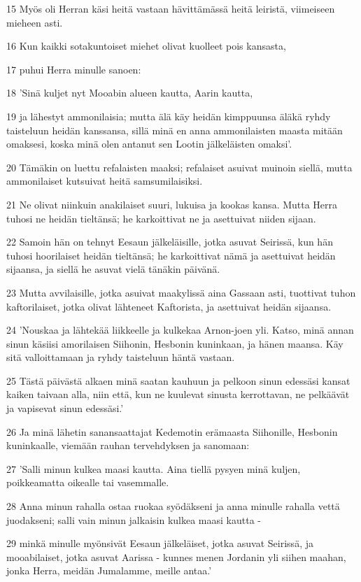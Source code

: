 \par 15 Myös oli Herran käsi heitä vastaan hävittämässä heitä leiristä, viimeiseen mieheen asti.
\par 16 Kun kaikki sotakuntoiset miehet olivat kuolleet pois kansasta,
\par 17 puhui Herra minulle sanoen:
\par 18 'Sinä kuljet nyt Mooabin alueen kautta, Aarin kautta,
\par 19 ja lähestyt ammonilaisia; mutta älä käy heidän kimppuunsa äläkä ryhdy taisteluun heidän kanssansa, sillä minä en anna ammonilaisten maasta mitään omaksesi, koska minä olen antanut sen Lootin jälkeläisten omaksi'.
\par 20 Tämäkin on luettu refalaisten maaksi; refalaiset asuivat muinoin siellä, mutta ammonilaiset kutsuivat heitä samsumilaisiksi.
\par 21 Ne olivat niinkuin anakilaiset suuri, lukuisa ja kookas kansa. Mutta Herra tuhosi ne heidän tieltänsä; he karkoittivat ne ja asettuivat niiden sijaan.
\par 22 Samoin hän on tehnyt Eesaun jälkeläisille, jotka asuvat Seirissä, kun hän tuhosi hoorilaiset heidän tieltänsä; he karkoittivat nämä ja asettuivat heidän sijaansa, ja siellä he asuvat vielä tänäkin päivänä.
\par 23 Mutta avvilaisille, jotka asuivat maakylissä aina Gassaan asti, tuottivat tuhon kaftorilaiset, jotka olivat lähteneet Kaftorista, ja asettuivat heidän sijaansa.
\par 24 'Nouskaa ja lähtekää liikkeelle ja kulkekaa Arnon-joen yli. Katso, minä annan sinun käsiisi amorilaisen Siihonin, Hesbonin kuninkaan, ja hänen maansa. Käy sitä valloittamaan ja ryhdy taisteluun häntä vastaan.
\par 25 Tästä päivästä alkaen minä saatan kauhuun ja pelkoon sinun edessäsi kansat kaiken taivaan alla, niin että, kun ne kuulevat sinusta kerrottavan, ne pelkäävät ja vapisevat sinun edessäsi.'
\par 26 Ja minä lähetin sanansaattajat Kedemotin erämaasta Siihonille, Hesbonin kuninkaalle, viemään rauhan tervehdyksen ja sanomaan:
\par 27 'Salli minun kulkea maasi kautta. Aina tiellä pysyen minä kuljen, poikkeamatta oikealle tai vasemmalle.
\par 28 Anna minun rahalla ostaa ruokaa syödäkseni ja anna minulle rahalla vettä juodakseni; salli vain minun jalkaisin kulkea maasi kautta -
\par 29 minkä minulle myönsivät Eesaun jälkeläiset, jotka asuvat Seirissä, ja mooabilaiset, jotka asuvat Aarissa - kunnes menen Jordanin yli siihen maahan, jonka Herra, meidän Jumalamme, meille antaa.'
